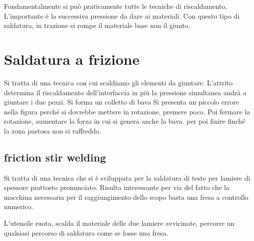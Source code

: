 Fondamentalmente si può praticamente tutte le tecniche di riscaldamento, L'importante è la successiva pressione da dare ai materiali.
Con questo tipo di saldatura, in trazione si rompe il materiale base non il giunto.

\section{Saldatura a frizione}
Si tratta di una tecnica con cui scaldiamo gli elementi da giuntare.
L'attrito determina il riscaldamento dell'interfaccia in più la pressione simultanea andrà a giuntare i due pezzi. Si forma un colletto di bava
Si presenta un piccolo errore nella figura perché si dovrebbe mettere in rotazione, premere poco.
Poi fermare la rotazione, aumentare la forza in cui si genera anche la bava. 
per poi finire finché la zona pastosa non si raffredda.

\subsection{friction stir welding}
Si tratta di una tecnica che si è sviluppata per la saldatura di teste per lamiere di spessore piuttosto pronunciato. 
Risulta interessante per via del fatto che la macchina necessaria per il raggiungimento dello scopo basta una fresa a controllo numerico.

L'utensile ruota, scalda il materiale delle due lamiere avvicinate, percorre un qualsiasi percorso di saldatura come se fosse una fresa. 